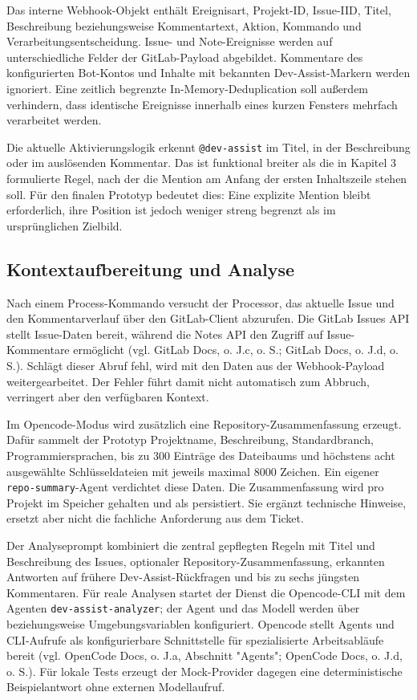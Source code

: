 Das interne Webhook-Objekt enthält Ereignisart, Projekt-ID, Issue-IID, Titel, Beschreibung beziehungsweise Kommentartext, Aktion, Kommando und Verarbeitungsentscheidung. Issue- und Note-Ereignisse werden auf unterschiedliche Felder der GitLab-Payload abgebildet. Kommentare des konfigurierten Bot-Kontos und Inhalte mit bekannten Dev-Assist-Markern werden ignoriert. Eine zeitlich begrenzte In-Memory-Deduplication soll außerdem verhindern, dass identische Ereignisse innerhalb eines kurzen Fensters mehrfach verarbeitet werden.

Die aktuelle Aktivierungslogik erkennt \texttt{@dev-assist} im Titel, in der Beschreibung oder im auslösenden Kommentar. Das ist funktional breiter als die in Kapitel 3 formulierte Regel, nach der die Mention am Anfang der ersten Inhaltszeile stehen soll. Für den finalen Prototyp bedeutet dies: Eine explizite Mention bleibt erforderlich, ihre Position ist jedoch weniger streng begrenzt als im ursprünglichen Zielbild.

\subsection{Kontextaufbereitung und Analyse}

Nach einem Process-Kommando versucht der Processor, das aktuelle Issue und den Kommentarverlauf über den GitLab-Client abzurufen. Die GitLab Issues API stellt Issue-Daten bereit, während die Notes API den Zugriff auf Issue-Kommentare ermöglicht (vgl. GitLab Docs, o. J.c, o. S.; GitLab Docs, o. J.d, o. S.). Schlägt dieser Abruf fehl, wird mit den Daten aus der Webhook-Payload weitergearbeitet. Der Fehler führt damit nicht automatisch zum Abbruch, verringert aber den verfügbaren Kontext.

Im Opencode-Modus wird zusätzlich eine Repository-Zusammenfassung erzeugt. Dafür sammelt der Prototyp Projektname, Beschreibung, Standardbranch, Programmiersprachen, bis zu 300 Einträge des Dateibaums und höchstens acht ausgewählte Schlüsseldateien mit jeweils maximal 8000 Zeichen. Ein eigener \texttt{repo-summary}-Agent verdichtet diese Daten. Die Zusammenfassung wird pro Projekt im Speicher gehalten und als  persistiert. Sie ergänzt technische Hinweise, ersetzt aber nicht die fachliche Anforderung aus dem Ticket.

Der Analyseprompt kombiniert die zentral gepflegten Regeln mit Titel und Beschreibung des Issues, optionaler Repository-Zusammenfassung, erkannten Antworten auf frühere Dev-Assist-Rückfragen und bis zu sechs jüngsten Kommentaren. Für reale Analysen startet der Dienst die Opencode-CLI mit dem Agenten \texttt{dev-assist-analyzer}; der Agent und das Modell werden über  beziehungsweise Umgebungsvariablen konfiguriert. Opencode stellt Agents und CLI-Aufrufe als konfigurierbare Schnittstelle für spezialisierte Arbeitsabläufe bereit (vgl. OpenCode Docs, o. J.a, Abschnitt "Agents"; OpenCode Docs, o. J.d, o. S.). Für lokale Tests erzeugt der Mock-Provider dagegen eine deterministische Beispielantwort ohne externen Modellaufruf.

